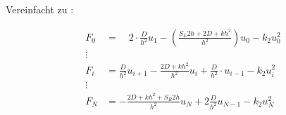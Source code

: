 Vereinfacht zu :

\begin{align*}
	F_0&= \quad 2\cdot \frac{D}{h^2}u_1-\left( \frac{S_L2h+2D+kh^2}{h^2}\right) u_0 -k_2u_0^2\\
	\vdots \\
	F_i&= 	\frac{D}{h^2}u_{i+1}-\frac{2D+kh^2}{h^2}u_i+\frac{D}{h^2}\cdot u_{i-1} -k_2u_i^2\\
	\vdots \\
	F_N &= -\frac{2D+kh^2+S_R2h}{h^2}u_N+2\frac{D}{h^2}u_{N-1}-k_2u^2_N\\
\end{align*}



